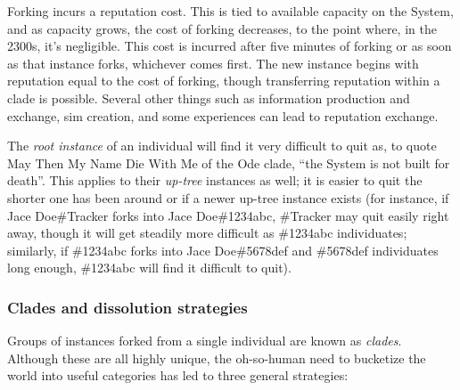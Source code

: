 Forking incurs a reputation cost. This is tied to available capacity on the System, and as capacity grows, the cost of forking decreases, to the point where, in the 2300s, it's negligible. This cost is incurred after five minutes of forking or as soon as that instance forks, whichever comes first. The new instance begins with reputation equal to the cost of forking, though transferring reputation within a clade is possible. Several other things such as information production and exchange, sim creation, and some experiences can lead to reputation exchange.

The \emph{root instance} of an individual will find it very difficult to quit as, to quote May Then My Name Die With Me of the Ode clade, ``the System is not built for death''. This applies to their \emph{up-tree} instances as well; it is easier to quit the shorter one has been around or if a newer up-tree instance exists (for instance, if Jace Doe\#Tracker forks into Jace Doe\#1234abc, \#Tracker may quit easily right away, though it will get steadily more difficult as \#1234abc individuates; similarly, if \#1234abc forks into Jace Doe\#5678def and \#5678def individuates long enough, \#1234abc will find it difficult to quit).

\subsubsection{Clades and dissolution strategies}

Groups of instances forked from a single individual are known as \emph{clades}. Although these are all highly unique, the oh-so-human need to bucketize the world into useful categories has led to three general strategies:

